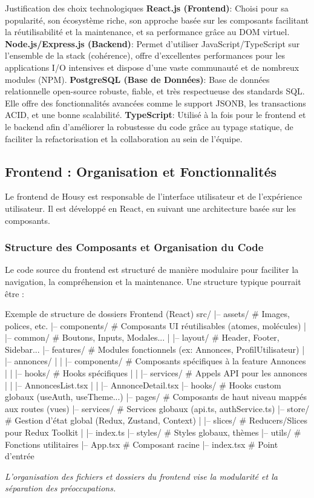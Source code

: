 \documentclass[11pt,a4paper]{report}
\newenvironment{codeblock}[1][Code Example]
  {\begin{tcolorbox}[colback=black!5!white, colframe=HousyGrey!70!black, title=#1, fonttitle=\bfseries\small, arc=2mm, boxrule=0.5pt,breakable]}
  {\end{tcolorbox}}
\begin{document}
\begin{tipbox}{Justification des choix technologiques}
\textbf{React.js (Frontend)}: Choisi pour sa popularité, son écosystème riche, son approche basée sur les composants facilitant la réutilisabilité et la maintenance, et sa performance grâce au DOM virtuel.
\textbf{Node.js/Express.js (Backend)}: Permet d'utiliser JavaScript/TypeScript sur l'ensemble de la stack (cohérence), offre d'excellentes performances pour les applications I/O intensives et dispose d'une vaste communauté et de nombreux modules (NPM).
\textbf{PostgreSQL (Base de Données)}: Base de données relationnelle open-source robuste, fiable, et très respectueuse des standards SQL. Elle offre des fonctionnalités avancées comme le support JSONB, les transactions ACID, et une bonne scalabilité.
\textbf{TypeScript}: Utilisé à la fois pour le frontend et le backend afin d'améliorer la robustesse du code grâce au typage statique, de faciliter la refactorisation et la collaboration au sein de l'équipe.
\end{tipbox}

\subsection{Frontend : Organisation et Fonctionnalités}
\label{ssec:frontend}
Le frontend de Housy est responsable de l'interface utilisateur et de l'expérience utilisateur. Il est développé en React, en suivant une architecture basée sur les composants.

\subsubsection{Structure des Composants et Organisation du Code}
Le code source du frontend est structuré de manière modulaire pour faciliter la navigation, la compréhension et la maintenance. Une structure typique pourrait être :
\begin{codeblock}{Exemple de structure de dossiers Frontend (React)}
src/
|-- assets/          # Images, polices, etc.
|-- components/      # Composants UI réutilisables (atomes, molécules)
|   |-- common/      # Boutons, Inputs, Modales...
|   |-- layout/      # Header, Footer, Sidebar...
|-- features/        # Modules fonctionnels (ex: Annonces, ProfilUtilisateur)
|   |-- annonces/
|   |   |-- components/ # Composants spécifiques à la feature Annonces
|   |   |-- hooks/      # Hooks spécifiques
|   |   |-- services/   # Appels API pour les annonces
|   |   |-- AnnoncesList.tsx
|   |   |-- AnnonceDetail.tsx
|-- hooks/           # Hooks custom globaux (useAuth, useTheme...)
|-- pages/           # Composants de haut niveau mappés aux routes (vues)
|-- services/        # Services globaux (api.ts, authService.ts)
|-- store/           # Gestion d'état global (Redux, Zustand, Context)
|   |-- slices/      # Reducers/Slices pour Redux Toolkit
|   |-- index.ts
|-- styles/          # Styles globaux, thèmes
|-- utils/           # Fonctions utilitaires
|-- App.tsx          # Composant racine
|-- index.tsx        # Point d'entrée
\end{codeblock}
\textit{L'organisation des fichiers et dossiers du frontend vise la modularité et la séparation des préoccupations.}
\end{document}
